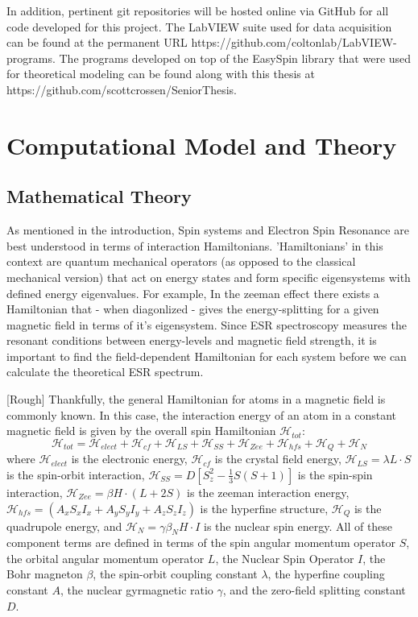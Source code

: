 \documentclass[oneside, astronomy, noacknowlegments]{BYUPhys}
\begin{document}
In addition, pertinent git repositories will be hosted online via GitHub for all code developed for this project. The LabVIEW suite used for data acquisition can be found at the permanent URL https://github.com/coltonlab/LabVIEW-programs. The programs developed on top of the EasySpin library that were used for theoretical modeling can be found along with this thesis at https://github.com/scottcrossen/SeniorThesis.










\chapter{Computational Model and Theory}

\section{Mathematical Theory}

As mentioned in the introduction, Spin systems and Electron Spin Resonance are best understood in terms of interaction Hamiltonians. 'Hamiltonians' in this context are quantum mechanical operators (as opposed to the classical mechanical version) that act on energy states and form specific eigensystems with defined energy eigenvalues. For example, In the zeeman effect there exists a Hamiltonian that - when diagonlized - gives the energy-splitting for a given magnetic field in terms of it's eigensystem. Since ESR spectroscopy measures the resonant conditions between energy-levels and magnetic field strength, it is important to find the field-dependent Hamiltonian for each system before we can calculate the theoretical ESR spectrum.

[Rough] Thankfully, the general Hamiltonian for atoms in a magnetic field is commonly known. In this case, the interaction energy of an atom in a constant magnetic field is given by the overall spin Hamiltonian $\mathcal{H}_{tot}$: $$\mathcal{H}_{tot} = \mathcal{H}_{elect} + \mathcal{H}_{cf} + \mathcal{H}_{LS} + \mathcal{H}_{SS} + \mathcal{H}_{Zee} + \mathcal{H}_{hfs} + \mathcal{H}_{Q} + \mathcal{H}_{N}$$ where $\mathcal{H}_{elect}$ is the electronic energy, $\mathcal{H}_{cf}$ is the crystal field energy, $\mathcal{H}_{LS} = \lambda L \cdot S$ is the spin-orbit interaction, $\mathcal{H}_{SS} = D \left[ S_{z}^{2} - \frac{1}{3} S (S+1) \right]$ is the spin-spin interaction, $\mathcal{H}_{Zee} = \beta H \cdot (L+2S)$ is the zeeman interaction energy, $\mathcal{H}_{hfs} = \left(A_xS_xI_x + A_yS_yI_y + A_zS_zI_z\right)$ is the hyperfine structure, $\mathcal{H}_{Q}$ is the quadrupole energy, and $\mathcal{H}_{N} = \gamma \beta_{N} H \cdot I$ is the nuclear spin energy. All of these component terms are defined in terms of the spin angular momentum operator $S$, the orbital angular momentum operator $L$, the Nuclear Spin Operator $I$, the Bohr magneton $\beta$, the spin-orbit coupling constant $\lambda$, the hyperfine coupling constant $A$, the nuclear gyrmagnetic ratio $\gamma$, and the zero-field splitting constant $D$.
\end{document}
